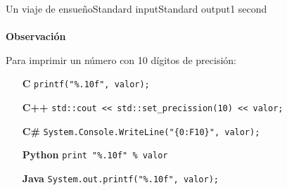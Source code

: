\begin{problem}{Un viaje de ensue\~no}{Standard input}{Standard output}{1 second}{}
~\\ \\
\textbf{\Large{\textsf{Observación}}}

Para imprimir un número con 10 dígitos de precisión:
\begin{itemize}[leftmargin=2cm]
\item[\textbf{C}] \texttt{printf("\%.10f", valor);}
\item[\textbf{C++}] \texttt{std::cout << std::set\_precission(10) << valor; }
\item[\textbf{C\#}] \texttt{System.Console.WriteLine("\{0:F10\}", valor);}
\item[\textbf{Python}] \texttt{print "\%.10f" \% valor}
\item[\textbf{Java}] \texttt{System.out.printf("\%.10f", valor);}
\end{itemize}
\end{problem}
